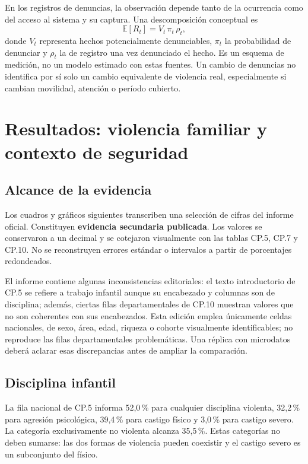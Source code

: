 \documentclass[11pt,a4paper]{article}
\begin{document}
En los registros de denuncias, la observación depende tanto de la ocurrencia
como del acceso al sistema y su captura. Una descomposición conceptual es
\begin{equation}
 \mathbb{E}[R_t] = V_t\,\pi_t\,\rho_t,
 \label{eq:registro}
\end{equation}
donde $V_t$ representa hechos potencialmente denunciables, $\pi_t$ la
probabilidad de denunciar y $\rho_t$ la de registro una vez denunciado el
hecho. Es un esquema de medición, no un modelo estimado con estas fuentes.
Un cambio de denuncias no identifica por sí solo un cambio equivalente de
violencia real, especialmente si cambian movilidad, atención o período cubierto.

\section{Resultados: violencia familiar y contexto de seguridad}
\subsection{Alcance de la evidencia}
Los cuadros y gráficos siguientes transcriben una selección de cifras del
informe oficial. Constituyen \textbf{evidencia secundaria publicada}.
Los valores se conservaron a un decimal y se cotejaron visualmente con las
tablas CP.5, CP.7 y CP.10. No se reconstruyen errores estándar o intervalos
a partir de porcentajes redondeados.

El informe contiene algunas inconsistencias editoriales: el texto introductorio
de CP.5 se refiere a trabajo infantil aunque su encabezado y columnas son de
disciplina; además, ciertas filas departamentales de CP.10 muestran valores
que no son coherentes con sus encabezados. Esta edición emplea únicamente
celdas nacionales, de sexo, área, edad, riqueza o cohorte visualmente identificables; no
reproduce las filas departamentales problemáticas. Una réplica con microdatos
deberá aclarar esas discrepancias antes de ampliar la comparación.

\subsection{Disciplina infantil}
La fila nacional de CP.5 informa 52,0\,\% para cualquier disciplina violenta,
32,2\,\% para agresión psicológica, 39,4\,\% para castigo físico y 3,0\,\% para
castigo severo. La categoría exclusivamente no violenta alcanza 35,5\,\%.
Estas categorías no deben sumarse: las dos formas de violencia pueden
coexistir y el castigo severo es un subconjunto del físico.
\end{document}
